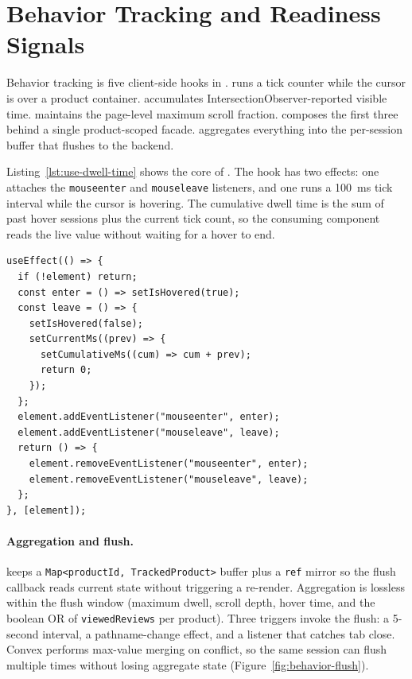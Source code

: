 \section{Behavior Tracking and Readiness Signals}
\label{sec:sys-behavior}

Behavior tracking is five client-side hooks in
.  runs a tick
counter while the cursor is over a product container.
 accumulates
IntersectionObserver-reported visible time.
 maintains the page-level maximum scroll
fraction.  composes the first three
behind a single product-scoped facade.
 aggregates everything into the
per-session buffer that flushes to the backend.

Listing~\ref{lst:use-dwell-time} shows the core of
. The hook has two effects: one attaches the
\texttt{mouseenter} and \texttt{mouseleave} listeners, and one
runs a 100~ms tick interval while the cursor is hovering. The
cumulative dwell time is the sum of past hover sessions plus the
current tick count, so the consuming component reads the live
value without waiting for a hover to end.

\begin{listing}[ht]
\begin{verbatim}
useEffect(() => {
  if (!element) return;
  const enter = () => setIsHovered(true);
  const leave = () => {
    setIsHovered(false);
    setCurrentMs((prev) => {
      setCumulativeMs((cum) => cum + prev);
      return 0;
    });
  };
  element.addEventListener("mouseenter", enter);
  element.addEventListener("mouseleave", leave);
  return () => {
    element.removeEventListener("mouseenter", enter);
    element.removeEventListener("mouseleave", leave);
  };
}, [element]);
\end{verbatim}
  \caption{The hover-tracking effect inside \texttt{useDwellTime}.}
  \label{lst:use-dwell-time}
\end{listing}

\paragraph{Aggregation and flush.}
 keeps a
\texttt{Map<productId, TrackedProduct>} buffer plus a
\texttt{ref} mirror so the flush callback reads current state
without triggering a re-render. Aggregation is lossless within
the flush window (maximum dwell, scroll depth, hover time, and
the boolean OR of \texttt{viewedReviews} per product). Three
triggers invoke the flush: a 5-second interval, a
pathname-change effect, and a  listener
that catches tab close. Convex performs max-value merging on
conflict, so the same session can flush multiple times without
losing aggregate state (Figure~\ref{fig:behavior-flush}).

